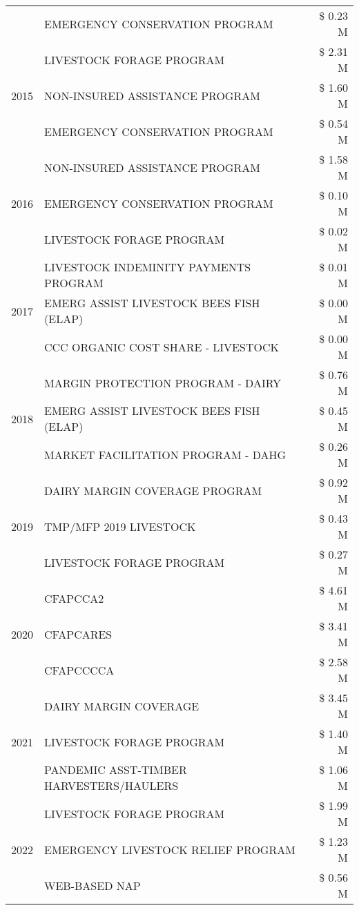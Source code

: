 \begin{tabular}{llr}
 & EMERGENCY CONSERVATION PROGRAM & \$ 0.23 M \\
\cline{1-3}
\multirow[t]{3}{*}{2015} & LIVESTOCK FORAGE PROGRAM & \$ 2.31 M \\
 & NON-INSURED ASSISTANCE PROGRAM & \$ 1.60 M \\
 & EMERGENCY CONSERVATION PROGRAM & \$ 0.54 M \\
\cline{1-3}
\multirow[t]{3}{*}{2016} & NON-INSURED ASSISTANCE PROGRAM & \$ 1.58 M \\
 & EMERGENCY CONSERVATION PROGRAM & \$ 0.10 M \\
 & LIVESTOCK FORAGE PROGRAM & \$ 0.02 M \\
\cline{1-3}
\multirow[t]{3}{*}{2017} & LIVESTOCK INDEMINITY PAYMENTS PROGRAM & \$ 0.01 M \\
 & EMERG ASSIST LIVESTOCK BEES FISH (ELAP) & \$ 0.00 M \\
 & CCC ORGANIC COST SHARE - LIVESTOCK & \$ 0.00 M \\
\cline{1-3}
\multirow[t]{3}{*}{2018} & MARGIN PROTECTION PROGRAM - DAIRY & \$ 0.76 M \\
 & EMERG ASSIST LIVESTOCK BEES FISH (ELAP) & \$ 0.45 M \\
 & MARKET FACILITATION PROGRAM - DAHG & \$ 0.26 M \\
\cline{1-3}
\multirow[t]{3}{*}{2019} & DAIRY MARGIN COVERAGE PROGRAM & \$ 0.92 M \\
 & TMP/MFP 2019 LIVESTOCK & \$ 0.43 M \\
 & LIVESTOCK FORAGE PROGRAM & \$ 0.27 M \\
\cline{1-3}
\multirow[t]{3}{*}{2020} & CFAPCCA2 & \$ 4.61 M \\
 & CFAPCARES & \$ 3.41 M \\
 & CFAPCCCCA & \$ 2.58 M \\
\cline{1-3}
\multirow[t]{3}{*}{2021} & DAIRY MARGIN COVERAGE & \$ 3.45 M \\
 & LIVESTOCK FORAGE PROGRAM & \$ 1.40 M \\
 & PANDEMIC ASST-TIMBER HARVESTERS/HAULERS & \$ 1.06 M \\
\cline{1-3}
\multirow[t]{3}{*}{2022} & LIVESTOCK FORAGE PROGRAM & \$ 1.99 M \\
 & EMERGENCY LIVESTOCK RELIEF PROGRAM & \$ 1.23 M \\
 & WEB-BASED NAP & \$ 0.56 M \\
\cline{1-3}
\bottomrule
\end{tabular}
